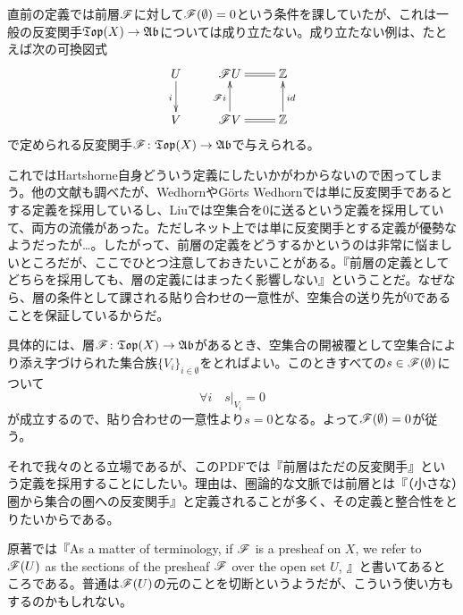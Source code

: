 
\begin{rem}
直前の定義では前層$\mathscr{F}$に対して$\mathscr{F}(\emptyset) = 0$という条件を課していたが、これは一般の反変関手$\mathfrak{Top}(X) \to \mathfrak{Ab}$については成り立たない。成り立たない例は、たとえば次の可換図式
\[
\xymatrix{
U \ar[d]_i & \scrf U \ar@{=}[r] & \Z \\
V & \scrf V \ar[u]^{\scrf i} \ar@{=}[r] & \Z \ar[u]_{id}
}
\]
で定められる反変関手$\mathscr{F} \colon \mathfrak{Top}(X) \to \mathfrak{Ab}$で与えられる。

これではHartshorne自身どういう定義にしたいかがわからないので困ってしまう。他の文献も調べたが、Wedhorn\cite{Wedhorn}やG\"{o}rts Wedhorn\cite{GW}では単に反変関手であるとする定義を採用しているし、Liu\cite{Liu}では空集合を$0$に送るという定義を採用していて、両方の流儀があった。ただしネット上では単に反変関手とする定義が優勢なようだったが…。したがって、前層の定義をどうするかというのは非常に悩ましいところだが、ここでひとつ注意しておきたいことがある。『前層の定義としてどちらを採用しても、層の定義にはまったく影響しない』ということだ。なぜなら、層の条件として課される貼り合わせの一意性が、空集合の送り先が$0$であることを保証しているからだ。

具体的には、層$\mathscr{F} \colon \mathfrak{Top}(X) \to \mathfrak{Ab}$があるとき、空集合の開被覆として空集合により添え字づけられた集合族$\{V_i\}_{i \in \emptyset}$をとればよい。このときすべての$s \in \mathscr{F}(\emptyset)$について
\[
\forall i  \quad s|_{V_i} = 0
\]
が成立するので、貼り合わせの一意性より$s=0$となる。よって$\mathscr{F}(\emptyset)=0$が従う。

それで我々のとる立場であるが、このPDFでは『前層はただの反変関手』という定義を採用することにしたい。理由は、圏論的な文脈では前層とは『（小さな）圏から集合の圏への反変関手』と定義されることが多く、その定義と整合性をとりたいからである。
\end{rem}



\begin{rem}
  原著では『As a matter of terminology, if $\mathscr{F}$ is a presheaf on $X$, we refer to $\mathscr{F}(U)$ as
the sections of the presheaf $\mathscr{F}$ over the open set $U$, 』と書いてあるところである。普通は$\mathscr{F}(U)$の元のことを切断というようだが、こういう使い方もするのかもしれない。
\end{rem}



